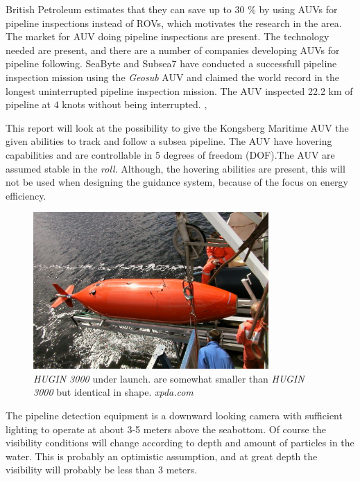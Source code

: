 	British Petroleum estimates that they can save up to 30 \% by using AUVs for pipeline inspections
	instead of ROVs, which motivates the research in the area. The market for AUV doing pipeline
	inspections are present. The technology needed are present, and there are a number of companies developing
	AUVs for pipeline following. SeaByte and Subsea7 have conducted a successfull pipeline inspection
	mission using the \textit{Geosub} AUV and claimed the world record in the longest uninterrupted
	pipeline inspection mission. The AUV inspected 22.2 km of pipeline at $4$ knots without being
	interrupted. \cite{Seabyte}, \cite{PhD_lecture}
	
	This report will look at the possibility to give the Kongsberg Maritime \hugin AUV the
	given abilities to track and follow a subsea pipeline. The AUV have hovering capabilities and are
	controllable in 5 degrees of freedom (DOF).The AUV are assumed stable in the \textit{roll}.
	Although, the hovering abilities are present, this will not be used when designing the guidance
	system, because of the focus on energy efficiency.

	\begin{figure}[htbp]
		\centering
		\includegraphics[width=0.8\textwidth]{pics/hugin3000}
		\caption[\textit{HUGIN} Vehicle]{\textit{HUGIN 3000} under launch. \hugin are somewhat 
		smaller than \textit{HUGIN 3000} but identical in shape. \textit{xpda.com}}
	\end{figure}

	The pipeline detection equipment is a downward looking camera with sufficient lighting to operate at about
	3-5 meters above the seabottom. Of course the visibility conditions will change according to depth and
	amount of particles in the water. This is probably an optimistic assumption, and at great
	depth the visibility will probably be less than 3 meters.

